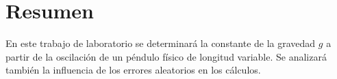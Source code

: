 \section{Resumen}

En este trabajo de laboratorio se determinará la constante de la gravedad $g$ a
partir de la oscilación de un péndulo físico de longitud variable. Se analizará
también la influencia de los errores aleatorios en los cálculos. 
